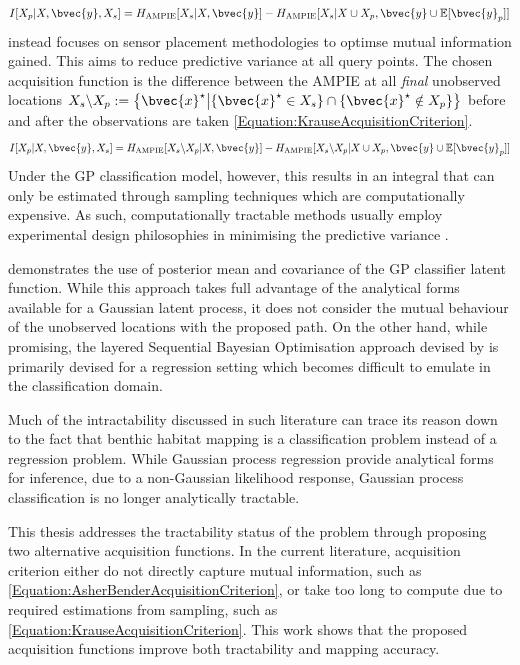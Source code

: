 \begin{equation}
				I[X_{p} | X, \bvec{y}, X_{s}] = H_{\mathrm{AMPIE}}[X_{s} | X, \bvec{y}] - H_{\mathrm{AMPIE}}[X_{s} | X \cup X_{p}, \bvec{y} \cup \mathbb{E}[\bvec{y}_{p}]]
			\label{Equation:AsherBenderAcquisitionCriterion}
			\end{equation} \cite{Krause:2008:NSP:1390681.1390689} instead focuses on sensor placement methodologies to optimse mutual information gained. This aims to reduce predictive variance at all query points. The chosen acquisition function is the difference between the AMPIE at all \textit{final} unobserved locations $X_{s} \backslash X_{p} := \big\{\bvec{x}^{\star} \big| \{\bvec{x}^{\star} \in X_{s}\} \cap \{\bvec{x}^{\star} \notin X_{p}\} \big\}$ before and after the observations are taken \eqref{Equation:KrauseAcquisitionCriterion}. \begin{equation}
				I[X_{p} | X, \bvec{y}, X_{s}] = H_{\mathrm{AMPIE}}[X_{s} \backslash X_{p} | X, \bvec{y}] - H_{\mathrm{AMPIE}}[X_{s} \backslash X_{p} | X \cup X_{p}, \bvec{y} \cup \mathbb{E}[\bvec{y}_{p}]]
			\label{Equation:KrauseAcquisitionCriterion}
			\end{equation} Under the GP classification model, however, this results in an integral that can only be estimated through sampling techniques which are computationally expensive. As such, computationally tractable methods usually employ experimental design philosophies in minimising the predictive variance \citep{AsherBender}.
			
			\cite{Kapoor} demonstrates the use of posterior mean and covariance of the GP classifier latent function. While this approach takes full advantage of the analytical forms available for a Gaussian latent process, it does not consider the mutual behaviour of the unobserved locations with the proposed path. On the other hand, while promising, the layered Sequential Bayesian Optimisation approach devised by \cite{Roman:SequentialBayesianOptimisation} is primarily devised for a regression setting which becomes difficult to emulate in the classification domain.
		
			Much of the intractability discussed in such literature can trace its reason down to the fact that benthic habitat mapping is a classification problem instead of a regression problem. While Gaussian process regression provide analytical forms for inference, due to a non-Gaussian likelihood response, Gaussian process classification is no longer analytically tractable.
			
			This thesis addresses the tractability status of the problem through proposing two alternative acquisition functions. In the current literature, acquisition criterion either do not directly capture mutual information, such as \eqref{Equation:AsherBenderAcquisitionCriterion}, or take too long to compute due to required estimations from sampling, such as \eqref{Equation:KrauseAcquisitionCriterion}. This work shows that the proposed acquisition functions improve both tractability and mapping accuracy.